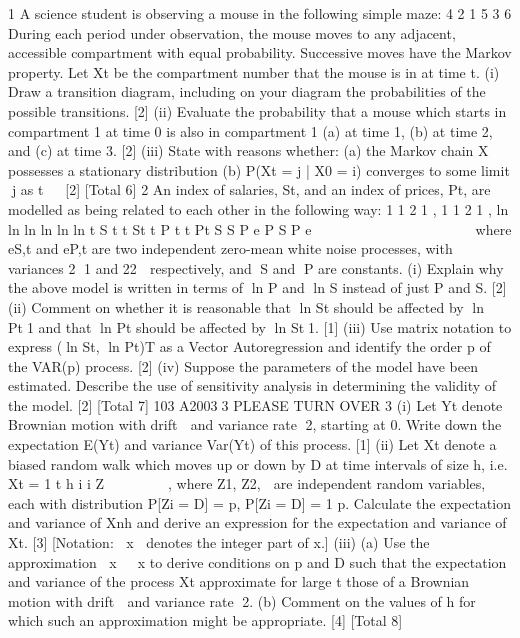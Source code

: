 \documentclass[a4paper,12pt]{article}
\begin{document}
\begin{enumerate}

1 A science student is observing a mouse in the following simple maze:
4
2
1 5
3
6
During each period under observation, the mouse moves to any adjacent, accessible
compartment with equal probability. Successive moves have the Markov property.
Let Xt be the compartment number that the mouse is in at time t.
(i) Draw a transition diagram, including on your diagram the probabilities of the
possible transitions. [2]
(ii) Evaluate the probability that a mouse which starts in compartment 1 at time 0
is also in compartment 1 (a) at time 1, (b) at time 2, and (c) at time 3. [2]
(iii) State with reasons whether:
(a) the Markov chain X possesses a stationary distribution
(b) P(Xt = j | X0 = i) converges to some limit j as t   [2]
[Total 6]
2 An index of salaries, St, and an index of prices, Pt, are modelled as being related to
each other in the following way:
1 1 2 1 ,
1 1 2 1 ,
ln ln ln
ln ln ln
t S t t St
t P t t Pt
S S P e
P S P e
 
 
    
    
where eS,t and eP,t are two independent zero-mean white noise processes, with
variances 2
1 and 22
 respectively, and S and P are constants.
(i) Explain why the above model is written in terms of ln P and ln S instead of
just P and S. [2]
(ii) Comment on whether it is reasonable that ln St should be affected by
ln Pt1 and that ln Pt should be affected by ln St1. [1]
(iii) Use matrix notation to express (ln St, ln Pt)T as a Vector Autoregression
and identify the order p of the VAR(p) process. [2]
(iv) Suppose the parameters of the model have been estimated. Describe the use of
sensitivity analysis in determining the validity of the model. [2]
[Total 7]
103 A20033 PLEASE TURN OVER
3 (i) Let Yt denote Brownian motion with drift  and variance rate 2, starting at 0.
Write down the expectation E(Yt) and variance Var(Yt) of this process. [1]
(ii) Let Xt denote a biased random walk which moves up or down by D at time
intervals of size h, i.e.
Xt = 1
t
h
i i Z
 
 
  ,
where Z1, Z2,  are independent random variables, each with distribution
P[Zi = D] = p, P[Zi = 	D] = 1 	 p. Calculate the expectation and variance of
Xnh and derive an expression for the expectation and variance of Xt. [3]
[Notation: x denotes the integer part of x.]
(iii) (a) Use the approximation x  x to derive conditions on p and D such
that the expectation and variance of the process Xt approximate for
large t those of a Brownian motion with drift  and variance rate 2.
(b) Comment on the values of h for which such an approximation might be
appropriate.
[4]
[Total 8]


\end{enumerate}
\end{document}
